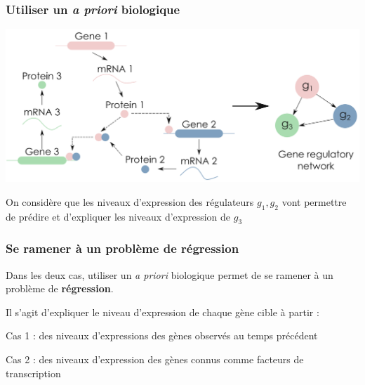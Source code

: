		 

	\begin{frame}
   \frametitle{Utiliser un \textbf{\textit{a priori} biologique}}
    	\vspace{-0.4cm}
    	\begin{center}
    	    \includegraphics[scale = 0.33]{Figures/Intro/network.PNG}
    	\end{center}
    	\scriptsize \cite{sanguinetti2019gene}
    	
    	
    	\begin{center}
\small    	
    	On considère que les niveaux d'expression des régulateurs $g_{1}, g_{2}$ vont permettre de prédire et d'expliquer les niveaux d'expression de $g_{3}$
    	\end{center}
	\end{frame}
	
	
	
		 
		 
\begin{frame}
   \frametitle{Se ramener à un problème de régression}
   Dans les deux cas, utiliser un \textit{a priori} biologique permet de se ramener à un problème de \textbf{régression}. 
   
   \vfill
   
   \pause 
   Il s'agit d'expliquer le niveau d'expression de chaque gène cible à partir : 
   \pause
   
   Cas 1 : des niveaux d'expressions des gènes observés au temps précédent
      \pause
      
Cas 2 : des niveaux d'expression des gènes connus comme facteurs de transcription

  
\end{frame}

	
